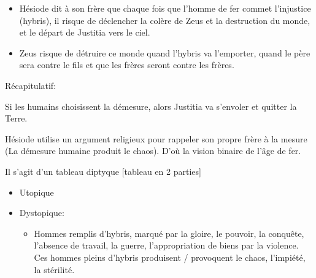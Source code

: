 \documentclass[a4paper, 11pt, hidelinks]{article}
\newcommand{\bs}{\bigskip}
\begin{document}
\begin{itemize}
    \item Hésiode dit à son frère que chaque fois que l'homme de fer commet l'injustice (hybris), il risque de déclencher la colère de Zeus
    et la destruction du monde, et le départ de \og Justitia \fg vers le ciel.
    \item Zeus risque de détruire ce monde quand l'hybris va l'emporter, quand le père sera contre le fils et que les frères seront contre les frères.
\end{itemize}

\bs

Récapitulatif:




\bs 

Si les humains choisissent la démesure, alors Justitia va s'envoler et quitter la Terre.

\bs

Hésiode utilise un argument religieux pour rappeler son propre frère à la mesure (La démesure humaine produit le chaos). D'où 
la vision binaire de l'âge de fer. 

\bs

Il s'agit d'un tableau diptyque [tableau en 2 parties]
\begin{itemize}
    \item Utopique
    \item Dystopique: 
    \begin{itemize}
        \item Hommes remplis d'hybris, marqué par la gloire, le pouvoir, la conquête, l'absence de travail, la guerre, l'appropriation
        de biens par la violence. Ces hommes pleins d'hybris produisent / provoquent le chaos, l'impiété, la stérilité.
    \end{itemize}
\end{itemize}
\end{document}
